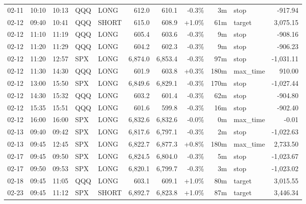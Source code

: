 \documentclass[11pt,a4paper,twoside]{article}
\begin{document}
\begin{center}
\begin{longtable}{>{\color{txtmain}}l l l l l r r r r >{\color{txtmain}}l r}
02-11 & 10:10 & 10:13 & QQQ & LONG & 612.0 & 610.1 & \textcolor{lossred}{-0.3\%} & 3m & stop & \textcolor{lossred}{-917.94} \\
02-12 & 09:40 & 10:41 & QQQ & SHORT & 615.0 & 608.9 & \textcolor{wingreen}{+1.0\%} & 61m & target & \textcolor{wingreen}{3,075.15} \\
02-12 & 11:10 & 11:19 & QQQ & LONG & 605.4 & 603.6 & \textcolor{lossred}{-0.3\%} & 9m & stop & \textcolor{lossred}{-908.16} \\
02-12 & 11:20 & 11:29 & QQQ & LONG & 604.2 & 602.3 & \textcolor{lossred}{-0.3\%} & 9m & stop & \textcolor{lossred}{-906.23} \\
02-12 & 11:20 & 12:57 & SPX & LONG & 6,874.0 & 6,853.4 & \textcolor{lossred}{-0.3\%} & 97m & stop & \textcolor{lossred}{-1,031.11} \\
02-12 & 11:30 & 14:30 & QQQ & LONG & 601.9 & 603.8 & \textcolor{wingreen}{+0.3\%} & 180m & max\_time & \textcolor{wingreen}{910.00} \\
02-12 & 13:00 & 15:50 & SPX & LONG & 6,849.6 & 6,829.1 & \textcolor{lossred}{-0.3\%} & 170m & stop & \textcolor{lossred}{-1,027.44} \\
02-12 & 14:30 & 15:32 & QQQ & LONG & 603.2 & 601.4 & \textcolor{lossred}{-0.3\%} & 62m & stop & \textcolor{lossred}{-904.80} \\
02-12 & 15:35 & 15:51 & QQQ & LONG & 601.6 & 599.8 & \textcolor{lossred}{-0.3\%} & 16m & stop & \textcolor{lossred}{-902.40} \\
02-12 & 16:00 & 16:00 & SPX & LONG & 6,832.6 & 6,832.6 & \textcolor{lossred}{-0.0\%} & 0m & max\_time & \textcolor{lossred}{-0.01} \\
02-13 & 09:40 & 09:42 & SPX & LONG & 6,817.6 & 6,797.1 & \textcolor{lossred}{-0.3\%} & 2m & stop & \textcolor{lossred}{-1,022.63} \\
02-13 & 09:45 & 12:45 & SPX & LONG & 6,822.7 & 6,877.3 & \textcolor{wingreen}{+0.8\%} & 180m & max\_time & \textcolor{wingreen}{2,733.50} \\
02-17 & 09:45 & 09:50 & SPX & LONG & 6,824.5 & 6,804.0 & \textcolor{lossred}{-0.3\%} & 5m & stop & \textcolor{lossred}{-1,023.67} \\
02-17 & 09:50 & 09:53 & SPX & LONG & 6,820.1 & 6,799.7 & \textcolor{lossred}{-0.3\%} & 3m & stop & \textcolor{lossred}{-1,023.02} \\
02-18 & 09:45 & 11:05 & QQQ & LONG & 603.1 & 609.1 & \textcolor{wingreen}{+1.0\%} & 80m & target & \textcolor{wingreen}{3,015.55} \\
02-23 & 09:45 & 11:12 & SPX & SHORT & 6,892.7 & 6,823.8 & \textcolor{wingreen}{+1.0\%} & 87m & target & \textcolor{wingreen}{3,446.34} \\

\end{longtable}
\end{center}
\end{document}
